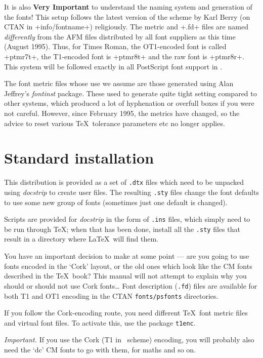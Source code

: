 \documentclass{article}
\begin{document}
It is also \textbf{Very Important} to understand the naming system and
generation of the fonts! This setup follows the latest version of the
scheme by Karl Berry (on CTAN in +info/fontname+) religiously.  The
metric and +.fd+ files are named \emph{differently} from the AFM files
distributed by all font suppliers as this time (August 1995).  Thus, for
Times Roman, the OT1-encoded font is called +ptmr7t+, the T1-encoded
font is +ptmr8t+ and the raw font is +ptmr8r+. This system will be
followed exactly in all PostScript font support in \LaTeXe.

The font metric files whose use we assume are those generated using
Alan Jeffrey's \emph{fontinst} package. These used to generate quite
tight setting compared to other systems, which produced a lot of
hyphenation or overfull boxes if you were not careful. However, since
February 1995, the metrics have changed, so the advice to reset
various \TeX\ tolerance parameters etc no longer applies.

\section{Standard installation}
This distribution is provided as a set of \verb+.dtx+ files which need
to be unpacked using \emph{docstrip} to create user files.  The
resulting \verb+.sty+ files change the font defaults to use some new
group of fonts (sometimes just one default is changed).

Scripts are provided for \emph{docstrip} in the form of \texttt{.ins}
files, which simply need to be run through \TeX; when that has been
done, install all the \texttt{.sty} files that result in a
directory where \LaTeX\ will find them.

You have an important decision to make at some point --- are you going
to use fonts encoded in the `Cork' layout, or the old ones which look
like the CM fonts described in the \TeX\ book? This manual will not
attempt to explain why you should or should not use Cork fonts\ldots
Font description (\texttt{.fd}) files are available for both T1 and OT1
encoding in the CTAN \texttt{fonts/psfonts} directories.

If you follow the Cork-encoding route, you need different \TeX\ font
metric files and virtual font files. To activate this, use the package
\texttt{t1enc}.

\emph{Important.} If you use the Cork (T1 in \LaTeXe\ scheme) encoding, you
will probably also need the `dc' CM fonts to go with them, for maths
and so on.
\end{document}
